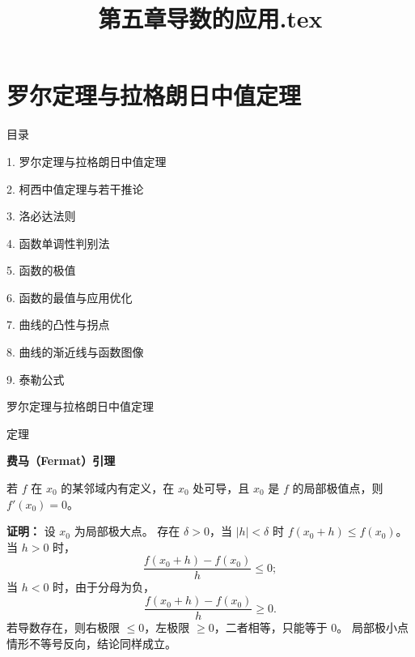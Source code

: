 \documentclass[aspectratio=169,10pt,fontset=fandol]{ctexbeamer}
\title{第五章导数的应用.tex}
\begin{document}
\section{罗尔定理与拉格朗日中值定理}
\begin{frame}[t,fragile]{目录}
\normalsize
{\color{blue}\normalsize 1. 罗尔定理与拉格朗日中值定理\par}\vspace{0.22em}
{\color{gray!40}\normalsize 2. 柯西中值定理与若干推论\par}\vspace{0.22em}
{\color{gray!40}\normalsize 3. 洛必达法则\par}\vspace{0.22em}
{\color{gray!40}\normalsize 4. 函数单调性判别法\par}\vspace{0.22em}
{\color{gray!40}\normalsize 5. 函数的极值\par}\vspace{0.22em}
{\color{gray!40}\normalsize 6. 函数的最值与应用优化\par}\vspace{0.22em}
{\color{gray!40}\normalsize 7. 曲线的凸性与拐点\par}\vspace{0.22em}
{\color{gray!40}\normalsize 8. 曲线的渐近线与函数图像\par}\vspace{0.22em}
{\color{gray!40}\normalsize 9. 泰勒公式\par}\vspace{0.22em}
\end{frame}
\begin{frame}[t,fragile]{罗尔定理与拉格朗日中值定理}
\normalsize
\begin{block}{定理}
{\normalsize
\textbf{费马（Fermat）引理}\par

若 $f$ 在 $x_0$ 的某邻域内有定义，在 $x_0$ 处可导，且 $x_0$ 是 $f$ 的局部极值点，则 $f'(x_0)=0$。

}
\end{block}
\pause
{\normalsize
\textbf{证明：}
设 $x_0$ 为局部极大点。 存在 $\delta>0$，当 $|h|<\delta$ 时 $f(x_0+h)\leq f(x_0)$。 当 $h>0$ 时，
\[
\frac{f(x_0+h)-f(x_0)}{h}\leq0;
\]
当 $h<0$ 时，由于分母为负，
\[
\frac{f(x_0+h)-f(x_0)}{h}\geq0.
\]
若导数存在，则右极限 $\leq0$，左极限 $\geq0$，二者相等，只能等于 $0$。 局部极小点情形不等号反向，结论同样成立。

}
\end{frame}
\end{document}
